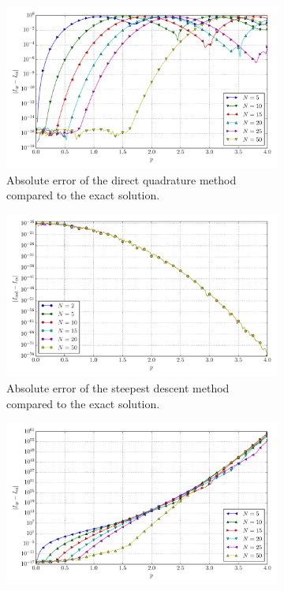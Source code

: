 \documentclass[a4paper,10pt]{article}
\begin{document}
\begin{figure}[ht!]
\begin{subfigure}[t]{0.5\linewidth}
    \includegraphics[width=\linewidth]{./plots/tp_1d_conv_p_0_0_err_qr.pdf}
    \caption{Absolute error of the direct quadrature method compared to the exact solution.}
    \label{fig:tp_1d_conv_p_0_0_err_qr}
  \end{subfigure}
  \begin{subfigure}[t]{0.5\linewidth}
    \includegraphics[width=\linewidth]{./plots/tp_1d_conv_p_0_0_err_nsd.pdf}
    \caption{Absolute error of the steepest descent method compared to the exact solution.}
    \label{fig:tp_1d_conv_p_0_0_err_nsd}
  \end{subfigure}
  \begin{subfigure}[t]{0.5\linewidth}
    \includegraphics[width=\linewidth]{./plots/tp_1d_conv_p_0_0_err_rel_qr.pdf}

\end{subfigure}
\end{figure}
\end{document}
